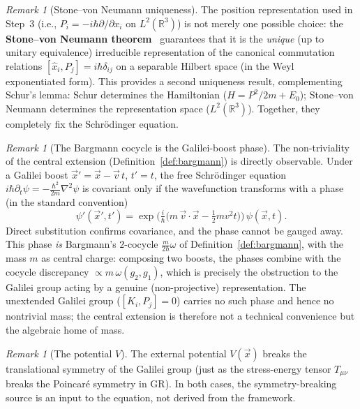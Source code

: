 \documentclass[12pt]{article}
\theoremstyle{plain}
\theoremstyle{definition}
\theoremstyle{remark}
\newtheorem{remark}[theorem]{Remark}
\begin{document}
\begin{remark}[Stone--von Neumann uniqueness]\label{rmk:stone-vn}
The position representation used in Step~3 (i.e., $P_i = -i\hbar\partial/\partial x_i$ on $L^2(\mathbb{R}^3)$) is not merely one possible choice: the \textbf{Stone--von Neumann theorem}~\cite{stonevn1931,vonneumann1931} guarantees that it is the \emph{unique} (up to unitary equivalence) irreducible representation of the canonical commutation relations $[\hat{x}_i, P_j] = i\hbar\delta_{ij}$ on a separable Hilbert space (in the Weyl exponentiated form). This provides a second uniqueness result, complementing Schur's lemma: Schur determines the Hamiltonian ($H = P^2/2m + E_0$); Stone--von Neumann determines the representation space ($L^2(\mathbb{R}^3)$). Together, they completely fix the Schr\"odinger equation.
\end{remark}

\begin{remark}[The Bargmann cocycle is the Galilei-boost phase]\label{rmk:bargmann-phase}
The non-triviality of the central extension (Definition~\ref{def:bargmann}) is directly observable. Under a
Galilei boost $\vec x'=\vec x-\vec v\,t$, $t'=t$, the free Schr\"odinger equation
$i\hbar\partial_t\psi=-\tfrac{\hbar^2}{2m}\nabla^2\psi$ is covariant only if the wavefunction transforms with a
phase (in the standard convention)
\[
\psi'(\vec x',t')=\exp\!\Big(\tfrac{i}{\hbar}\big(m\,\vec v\cdot\vec x-\tfrac12 m v^2 t\big)\Big)\,\psi(\vec x,t).
\]
Direct substitution confirms covariance, and the phase cannot be gauged away. This phase \emph{is} Bargmann's
$2$-cocycle $\tfrac{m}{2\hbar}\omega$ of Definition~\ref{def:bargmann}, with the mass $m$ as central charge:
composing two boosts, the phases combine with the cocycle discrepancy $\propto m\,\omega(g_2,g_1)$, which is
precisely the obstruction to the Galilei group acting by a genuine (non-projective) representation. The
unextended Galilei group ($[K_i,P_j]=0$) carries no such phase and hence no nontrivial mass; the central
extension is therefore not a technical convenience but the algebraic home of mass.
\end{remark}

\begin{remark}[The potential $V$]
The external potential $V(\vec{x})$ breaks the translational symmetry of the Galilei group (just as the stress-energy tensor $T_{\mu\nu}$ breaks the Poincar\'e symmetry in GR). In both cases, the symmetry-breaking source is an input to the equation, not derived from the framework.
\end{remark}
\end{document}
